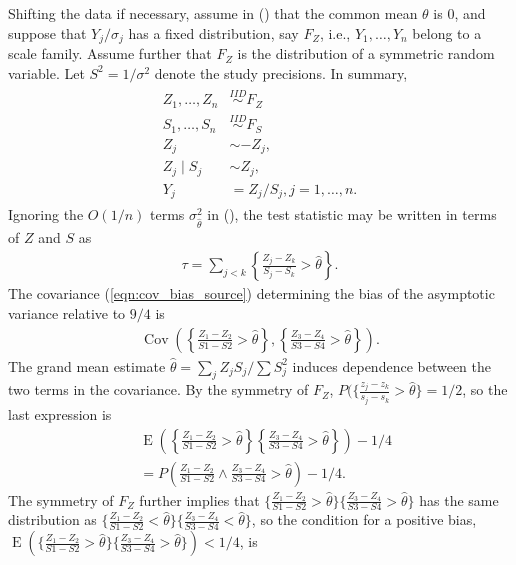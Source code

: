\documentclass[12pt]{article}
\renewcommand{\P}{P}
\newcommand{\z}{Z}
\newcommand{\y}{Y}
\newcommand{\s}{S}
\newcommand{\thetahat}{\hat{\theta}}
\newcommand{\zs}[2]{\frac{\z_{#1}-\z_{#2}}{\s{#1}-\s{#2}}}
\DeclareMathOperator{\E}{E}
\DeclareMathOperator{\Cov}{Cov}
\begin{document}
    Shifting the data if necessary, assume in ()
    that the common mean $\theta$ is $0$, and suppose that $\y_j/\sigma_j$
    has a fixed distribution, say $F_Z$, i.e., 
    $\y_1,\ldots,\y_n$ belong to a scale
    family. %
    Assume
    further that $F_Z$ is the distribution of a symmetric random
    variable. Let $\s^2=1/\sigma^2$ denote the study precisions. In summary,
    \begin{align}
      \begin{split}
        \label{model:symmetric}
        \z_1,\ldots,\z_n &\overset{IID}{\sim} F_Z\\
        \s_1,\ldots,\s_n &\overset{IID}{\sim}  F_S\\
        \z_j &\sim -\z_j,\\
        \z_j \mid \s_j &\sim \z_j,\\
        \y_j&=\z_j/\s_j,j=1,\ldots,n.
      \end{split}
    \end{align}
    Ignoring the $O(1/n)$ terms $\sigma_{\thetahat}^2$ in (), the test statistic may be written in terms of $\z$ and $\s$ as
    \begin{align}
      \tau=\sum_{j<k}\left\{\frac{\z_j-\z_k}{\s_j-\s_k}>\thetahat\right\}.
    \end{align}
    The covariance (\ref{eqn:cov_bias_source}) determining the bias of the asymptotic variance relative to $9/4$ is
    \begin{align}
      \Cov\left(\left\{\zs{1}{2}>\thetahat\right\},\left\{\zs{3}{4}>\thetahat\right\} \right).
    \end{align}
    The grand mean estimate $\thetahat=\sum_j \z_j\s_j/\sum \s_j^2$ %
    induces dependence
    between the two terms in the covariance. By the symmetry of $F_Z$, $\P(\{\frac{z_j-z_k}{s_j-s_k}>\thetahat\}=1/2$, so the last expression is
    \begin{align}
      &\E\left(\left\{\zs{1}{2}>\thetahat\right\}\left\{\zs{3}{4}>\thetahat\right\}\right)-1/4\\
      &=\P\left(\zs{1}{2}\wedge\zs{3}{4}>\thetahat\right)-1/4.
    \end{align}    
    The symmetry of $F_Z$ further implies that $\{\zs{1}{2}>\thetahat\}\{\zs{3}{4}>\thetahat\}$ has the same distribution as $\{\zs{1}{2}<\thetahat\}\{\zs{3}{4}<\thetahat\}$, so the condition for a positive bias, $\E(\{\zs{1}{2}>\thetahat\}\{\zs{3}{4}>\thetahat\})<1/4$, is
\end{document}
